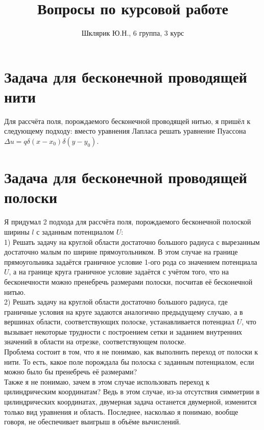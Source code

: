 \documentclass{report}
\title{Вопросы по курсовой работе}
\author{Шклярик Ю.Н., 6 группа, 3 курс}
\begin{document}
\maketitle

\section{Задача для бесконечной проводящей нити}
Для рассчёта поля, порождаемого бесконечной проводящей нитью, я пришёл к следующему подходу: вместо уравнения Лапласа решать уравнение Пуассона $\Delta u=q\delta(x-x_0)\delta(y-y_0)$.

\section{Задача для бесконечной проводящей полоски}
Я придумал 2 подхода для рассчёта поля, порождаемого бесконечной полоской ширины $l$ с заданным потенциалом $U$:\\
1) Решать задачу на круглой области достаточно большого радиуса с вырезанным достаточно малым по ширине прямоугольником. В этом случае на границе прямоугольника задаётся граничное условие 1-ого рода со значением потенциала $U$, а на границе круга граничное условие задаётся с учётом того, что на бесконечности можно пренебречь размерами полоски, посчитав её бесконечной нитью.\\
2) Решать задачу на круглой области достаточно большого радиуса, где граничные условия на круге задаются аналогично предыдущему случаю, а в вершинах области, соответствующих полоске, устанавливается потенциал $U$, что вызывает некоторые трудности с построением сетки и заданием внутренних значений в области на отрезке, соответствующем полоске.\\
Проблема состоит в том, что я не понимаю, как выполнить переход от полоски к нити. То есть, какое поле порождала бы полоска с заданным потенциалом, если можно было бы пренебречь её размерами?\\
Также я не понимаю, зачем в этом случае использовать переход к цилиндрическим координатам? Ведь в этом случае, из-за отсутствия симметрии в цилиндрических координатах, двумерная задача останется двумерной, изменится только вид уравнения и область. Последнее, насколько я понимаю, вообще говоря, не обеспечивает выигрыш в объёме вычислений.
\end{document}

